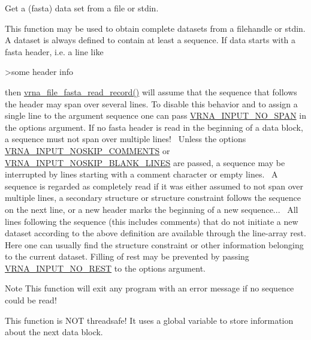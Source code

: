 Get a (fasta) data set from a file or stdin. 

This function may be used to obtain complete datasets from a filehandle or stdin. A dataset is always defined to contain at least a sequence. If data starts with a fasta header, i.\+e. a line like \begin{DoxyVerb}>some header info \end{DoxyVerb}
 then \hyperlink{group__file__utils_ga8cfb7e271efc9e1f34640acb85475639}{vrna\+\_\+file\+\_\+fasta\+\_\+read\+\_\+record()} will assume that the sequence that follows the header may span over several lines. To disable this behavior and to assign a single line to the argument \textquotesingle{}sequence\textquotesingle{} one can pass \hyperlink{group__utils_ga0de536599b881c787b0943a2671da476}{V\+R\+N\+A\+\_\+\+I\+N\+P\+U\+T\+\_\+\+N\+O\+\_\+\+S\+P\+AN} in the \textquotesingle{}options\textquotesingle{} argument. If no fasta header is read in the beginning of a data block, a sequence must not span over multiple lines!~\newline
 Unless the options \hyperlink{group__utils_ga0f6311f11bed1842e3a527ab27b294c6}{V\+R\+N\+A\+\_\+\+I\+N\+P\+U\+T\+\_\+\+N\+O\+S\+K\+I\+P\+\_\+\+C\+O\+M\+M\+E\+N\+TS} or \hyperlink{group__utils_gab4db885222b3b69608310d7c7e63e286}{V\+R\+N\+A\+\_\+\+I\+N\+P\+U\+T\+\_\+\+N\+O\+S\+K\+I\+P\+\_\+\+B\+L\+A\+N\+K\+\_\+\+L\+I\+N\+ES} are passed, a sequence may be interrupted by lines starting with a comment character or empty lines.~\newline
 A sequence is regarded as completely read if it was either assumed to not span over multiple lines, a secondary structure or structure constraint follows the sequence on the next line, or a new header marks the beginning of a new sequence...~\newline
 All lines following the sequence (this includes comments) that do not initiate a new dataset according to the above definition are available through the line-\/array \textquotesingle{}rest\textquotesingle{}. Here one can usually find the structure constraint or other information belonging to the current dataset. Filling of \textquotesingle{}rest\textquotesingle{} may be prevented by passing \hyperlink{group__utils_ga7a2e8c50a0c7ce82e60da1016e1367fd}{V\+R\+N\+A\+\_\+\+I\+N\+P\+U\+T\+\_\+\+N\+O\+\_\+\+R\+E\+ST} to the options argument.~\newline
 \begin{DoxyNote}{Note}
This function will exit any program with an error message if no sequence could be read! 

This function is N\+OT threadsafe! It uses a global variable to store information about the next data block.
\end{DoxyNote}
